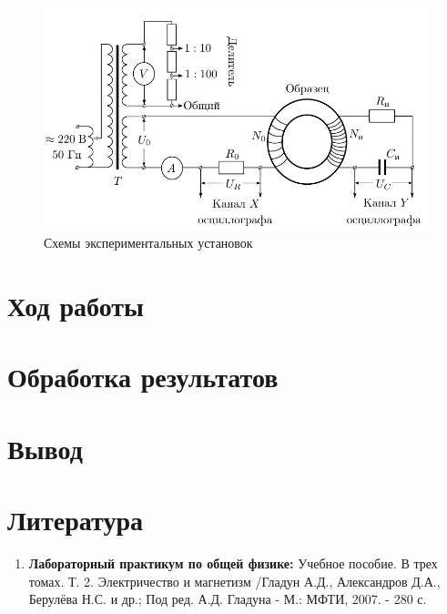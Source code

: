 \documentclass[a4paper, 12pt]{article}%
\begin{document}
\begin{figure}[h!]
    \centering
	\includegraphics[width = \textwidth]{1.png}
    \caption{Схемы экспериментальных установок}
    \label{scheme}
\end{figure}


\section{Ход работы}


\section{Обработка результатов}


\section{Вывод}
 
\section{Литература}

\begin{enumerate}

\item \textbf{Лабораторный практикум по общей физике:} Учебное пособие. В трех томах. Т. 2. Электричество и магнетизм /Гладун А.Д., Александров Д.А., Берулёва Н.С. и др.; Под ред. А.Д. Гладуна - М.: МФТИ, 2007. - 280 с.

\end{enumerate}		
		
\end{document}
